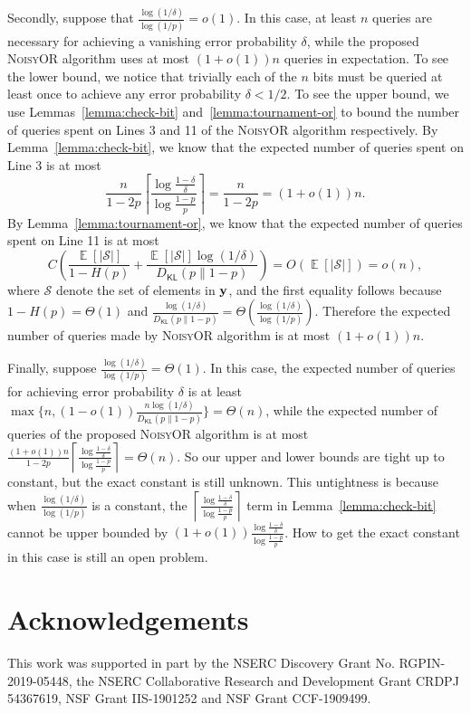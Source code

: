 \documentclass[journal, onecolumn]{IEEEtran}
\theoremstyle{plain}
\theoremstyle{definition}
\theoremstyle{remark}
\DeclareMathOperator\E{\mathbb{E}}
\def\DKL{{D_\mathsf{KL}(p\|1-p)}}
\newcommand{\sno}{\textsc{NoisyOR }}
\begin{document}
Secondly, suppose that $\frac{\log(1/\delta)}{\log(1/p)}=o(1)$. In this case, at least $n$ queries are necessary for achieving a vanishing error probability $\delta$, while the proposed \sno algorithm uses at most $(1+o(1))n$ queries in expectation. To see the lower bound, we notice that trivially each of the $n$ bits must be queried at least once to achieve any error probability $\delta<1/2$. To see the upper bound, we use Lemmas~\ref{lemma:check-bit} and~\ref{lemma:tournament-or} to bound the number of queries spent on Lines 3 and 11 of the \sno algorithm respectively.  By Lemma~\ref{lemma:check-bit}, we know that the expected number of queries spent on Line 3 is at most
\[
     \frac{n}{1-2p}\left\lceil\frac{\log\frac{1-\delta}{\delta}}{\log\frac{1-p}{p}}\right\rceil=\frac{n}{1-2p}=(1+o(1))n.
\]
By Lemma~\ref{lemma:tournament-or}, we know that the expected number of queries spent on Line 11 is at most
\[
     C\left(\frac{\E[|\mathcal{S}|]}{1-H(p)}+\frac{\E[|\mathcal{S}|]\log(1/\delta)}{\DKL}\right)=O(\E[|\mathcal{S}|])=o(n),
\]
where $\mathcal{S}$ denote the set of elements in ${\bf y}$, and the first equality follows because $1-H(p)=\Theta(1)$ and $\frac{\log(1/\delta)}{\DKL}=\Theta(\frac{\log(1/\delta)}{\log(1/p)})$. Therefore the expected number of queries made by \sno algorithm is at most $(1+o(1))n$.

Finally, suppose $\frac{\log(1/\delta)}{\log(1/p)}=\Theta(1)$. In this case, the expected number of queries for achieving error probability $\delta$ is at least $\max\{n,(1-o(1))\frac{n\log(1/\delta)}{\DKL}\}=\Theta(n)$, while the expected number of queries of the proposed \sno algorithm is at most $\frac{(1+o(1))n}{1-2p}\left\lceil\frac{\log\frac{1-\delta}{\delta}}{\log\frac{1-p}{p}}\right\rceil=\Theta(n)$. So our upper and lower bounds are tight up to constant, but the exact constant is still unknown. This untightness is because when $\frac{\log(1/\delta)}{\log(1/p)}$ is a constant, the $\left\lceil\frac{\log\frac{1-\delta}{\delta}}{\log\frac{1-p}{p}}\right\rceil$ term in Lemma~\ref{lemma:check-bit} cannot be upper bounded by $(1+o(1))\frac{\log\frac{1-\delta}{\delta}}{\log\frac{1-p}{p}}$. How to get the exact constant in this case is still an open problem.








\section*{Acknowledgements}
This work was supported in part by the NSERC Discovery Grant No. RGPIN-2019-05448, the NSERC Collaborative Research and Development Grant CRDPJ 54367619, NSF Grant IIS-1901252 and NSF Grant CCF-1909499.
\end{document}
